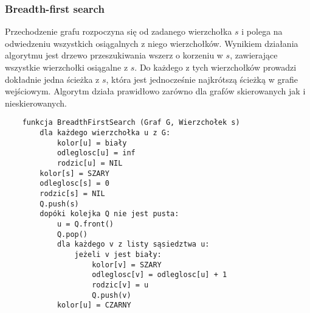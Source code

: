 \subsubsection{Breadth-first search}

Przechodzenie grafu rozpoczyna się od zadanego wierzchołka $s$ i polega na odwiedzeniu wszystkich osiągalnych z niego wierzchołków.
Wynikiem działania algorytmu jest drzewo przeszukiwania wszerz o korzeniu w $s$, zawierające wszystkie wierzchołki osiągalne z $s$.
Do każdego z tych wierzchołków prowadzi dokładnie jedna ścieżka z $s$, która jest jednocześnie najkrótszą ścieżką w grafie wejściowym.
Algorytm działa prawidłowo zarówno dla grafów skierowanych jak i nieskierowanych. \\

\begin{samepage}
    \begin{verbatim}
    funkcja BreadthFirstSearch (Graf G, Wierzchołek s)
        dla każdego wierzchołka u z G:
            kolor[u] = biały
            odleglosc[u] = inf
            rodzic[u] = NIL
        kolor[s] = SZARY
        odleglosc[s] = 0
        rodzic[s] = NIL
        Q.push(s)
        dopóki kolejka Q nie jest pusta:
            u = Q.front()
            Q.pop()
            dla każdego v z listy sąsiedztwa u:
                jeżeli v jest biały:
                    kolor[v] = SZARY
                    odleglosc[v] = odleglosc[u] + 1
                    rodzic[v] = u
                    Q.push(v)
            kolor[u] = CZARNY
    \end{verbatim}
\end{samepage}
